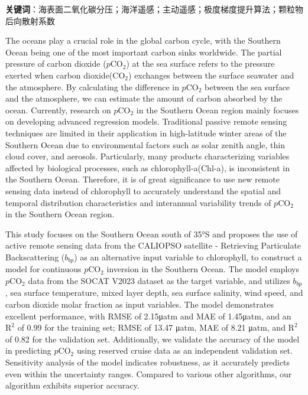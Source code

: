 \textbf{关键词}：海表面二氧化碳分压；海洋遥感；主动遥感；极度梯度提升算法；颗粒物后向散射系数

\cleardoublepage
The oceans play a crucial role in the global carbon cycle, with the Southern Ocean being one of the most important carbon sinks worldwide. The partial pressure of carbon dioxide ($p\mathrm{CO_2}$) at the sea surface refers to the pressure exerted when carbon dioxide($\mathrm{CO_2}$) exchanges between the surface seawater and the atmosphere. 
By calculating the difference in $p\mathrm{CO_2}$ between the sea surface and the atmosphere, we can estimate the amount of carbon absorbed by the ocean. 
Currently, research on $p\mathrm{CO_2}$ in the Southern Ocean region mainly focuses on developing advanced regression models. 
Traditional passive remote sensing techniques are limited in their application in high-latitude winter areas of the Southern Ocean due to environmental factors such as solar zenith angle, thin cloud cover, and aerosols. 
Particularly, many products characterizing variables affected by biological processes, such as chlorophyll-a(Chl-a), is inconsistent in the Southern Ocean. Therefore, it is of great significance to use new remote sensing data instead of chlorophyll to accurately understand the spatial and temporal distribution characteristics and interannual variability trends of $p\mathrm{CO_2}$ in the Southern Ocean region.

This study focuses on the Southern Ocean south of 35°S and proposes the use of active remote sensing data from the CALIOPSO satellite - Retrieving Particulate Backscattering ($b_{bp}$) as an alternative input variable to chlorophyll, to construct a model for continuous $p\mathrm{CO_2}$ inversion in the Southern Ocean. The model employs $p\mathrm{CO_2}$ data from the SOCAT V2023 dataset as the target variable, and utilizes $b_{bp}$, sea surface temperature, mixed layer depth, sea surface salinity, wind speed, and carbon dioxide molar fraction as input variables. The model demonstrates excellent performance, with RMSE of 2.15μatm and MAE of 1.45μatm, and an $\mathrm{R^2}$ of 0.99 for the training set; RMSE of 13.47 μatm, MAE of 8.21 μatm, and $\mathrm{R^2}$ of 0.82 for the validation set. Additionally, we validate the accuracy of the model in predicting $p\mathrm{CO_2}$ using reserved cruise data as an independent validation set. Sensitivity analysis of the model indicates robustness, as it accurately predicts even within the uncertainty ranges. 
Compared to various other algorithms, our algorithm exhibits superior accuracy.

